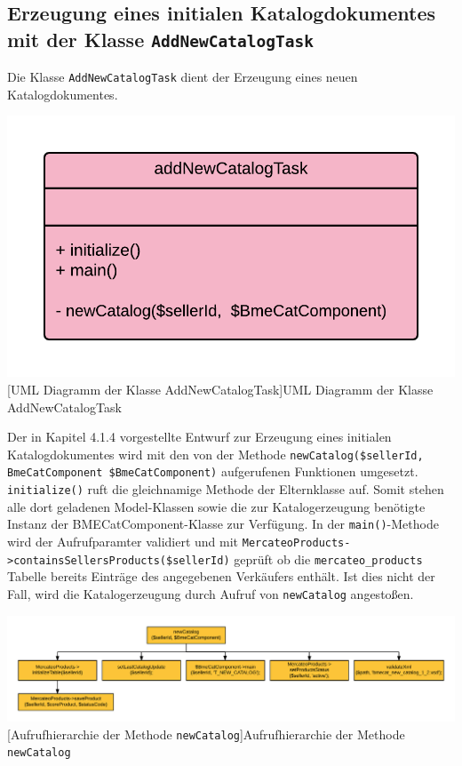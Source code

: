 {	
	
	\subsection{Erzeugung eines initialen Katalogdokumentes mit der Klasse \texttt{AddNewCatalogTask}}
	
	Die Klasse \texttt{AddNewCatalogTask} dient der Erzeugung eines neuen Katalogdokumentes. \\
	\begin{minipage}{\linewidth}
			\vspace{1em}
			\centering
			\includegraphics[width=0.5 \linewidth]{img/AddNewCatalogTaskUML}
			[UML Diagramm der Klasse AddNewCatalogTask]{UML Diagramm der Klasse AddNewCatalogTask}
			\vspace{1em}
	\end{minipage}
	Der in Kapitel 4.1.4 vorgestellte Entwurf zur Erzeugung eines initialen Katalogdokumentes wird mit den von der Methode \texttt{newCatalog(\$sellerId, BmeCatComponent \$BmeCatComponent)} aufgerufenen Funktionen umgesetzt.
	\texttt{initialize()} ruft die gleichnamige Methode der Elternklasse auf. Somit stehen alle dort geladenen Model-Klassen sowie die zur Katalogerzeugung benötigte Instanz der BMECatComponent-Klasse zur Verfügung.
	In der \texttt{main()}-Methode wird der Aufrufparamter validiert und mit \texttt{MercateoProducts->containsSellersProducts(\$sellerId)} geprüft ob die \texttt{mercateo\_products} Tabelle bereits Einträge des angegebenen Verkäufers enthält. Ist dies nicht der Fall, wird die Katalogerzeugung durch Aufruf von \texttt{newCatalog} angestoßen.
	
	 
	\begin{minipage}{\linewidth}
		\vspace{1em}
		\centering
		\includegraphics[width=1 \linewidth]{img/newCatalogAufrufhierarchie}
		[Aufrufhierarchie der Methode \texttt{newCatalog}]{Aufrufhierarchie der Methode \texttt{newCatalog}}
		\vspace{1em}
	\end{minipage}

}

